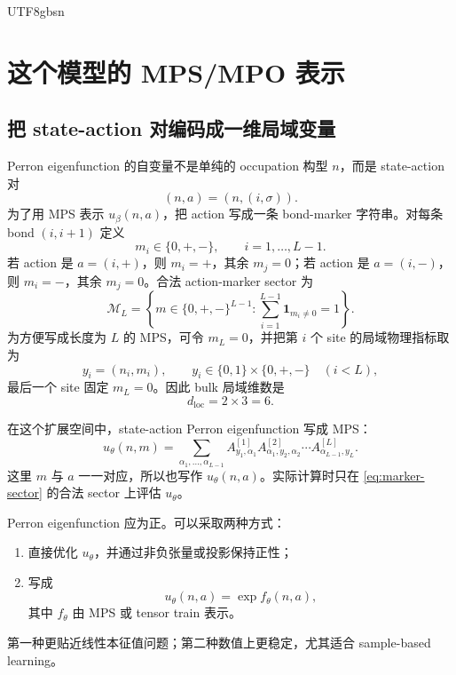 \documentclass[11pt]{article}
\begin{document}
\begin{CJK*}{UTF8}{gbsn}
\section{这个模型的 MPS/MPO 表示}

\subsection{把 state-action 对编码成一维局域变量}

Perron eigenfunction 的自变量不是单纯的 occupation 构型 \(n\)，而是 state-action 对
\begin{equation}
    (n,a)=(n,(i,\sigma)).
\end{equation}
为了用 MPS 表示 \(u_\beta(n,a)\)，把 action 写成一条 bond-marker 字符串。对每条 bond
\((i,i+1)\) 定义
\begin{equation}
    m_i\in\{0,+,-\},
    \qquad
    i=1,\dots,L-1.
\end{equation}
若 action 是 \(a=(i,+)\)，则 \(m_i=+\)，其余 \(m_j=0\)；若 action 是 \(a=(i,-)\)，
则 \(m_i=-\)，其余 \(m_j=0\)。合法 action-marker sector 为
\begin{equation}
    \mathcal M_L
    =
    \left\{
        m\in\{0,+,-\}^{L-1}:
        \sum_{i=1}^{L-1}\mathbf 1_{m_i\neq 0}=1
    \right\}.
    \label{eq:marker-sector}
\end{equation}
为方便写成长度为 \(L\) 的 MPS，可令 \(m_L=0\)，并把第 \(i\) 个 site 的局域物理指标取为
\begin{equation}
    y_i=(n_i,m_i),
    \qquad
    y_i\in\{0,1\}\times\{0,+,-\}
    \quad (i<L),
\end{equation}
最后一个 site 固定 \(m_L=0\)。因此 bulk 局域维数是
\begin{equation}
    d_{\mathrm{loc}}=2\times 3=6.
\end{equation}

在这个扩展空间中，state-action Perron eigenfunction 写成 MPS：
\begin{equation}
    u_\theta(n,m)
    =
    \sum_{\alpha_1,\dots,\alpha_{L-1}}
    A^{[1]}_{y_1,\alpha_1}
    A^{[2]}_{\alpha_1,y_2,\alpha_2}
    \cdots
    A^{[L]}_{\alpha_{L-1},y_L}.
    \label{eq:state-action-mps}
\end{equation}
这里 \(m\) 与 \(a\) 一一对应，所以也写作 \(u_\theta(n,a)\)。实际计算时只在
\eqref{eq:marker-sector} 的合法 sector 上评估 \(u_\theta\)。

Perron eigenfunction 应为正。可以采取两种方式：
\begin{enumerate}
    \item 直接优化 \(u_\theta\)，并通过非负张量或投影保持正性；
    \item 写成
    \begin{equation}
        u_\theta(n,a)=\exp f_\theta(n,a),
        \label{eq:positive-param}
    \end{equation}
    其中 \(f_\theta\) 由 MPS 或 tensor train 表示。
\end{enumerate}
第一种更贴近线性本征值问题；第二种数值上更稳定，尤其适合 sample-based learning。


\end{CJK*}
\end{document}
